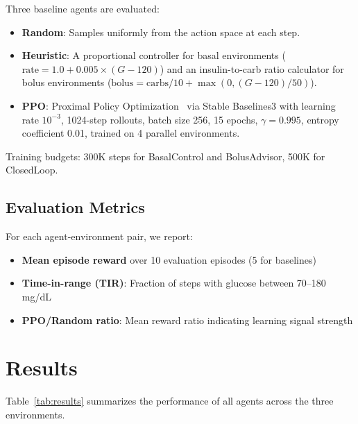 \documentclass[11pt]{article}
\begin{document}
Three baseline agents are evaluated:
\begin{itemize}
    \item \textbf{Random}: Samples uniformly from the action space at each step.
    \item \textbf{Heuristic}: A proportional controller for basal environments ($\text{rate} = 1.0 + 0.005 \times (G - 120)$) and an insulin-to-carb ratio calculator for bolus environments ($\text{bolus} = \text{carbs} / 10 + \max(0, (G - 120) / 50)$).
    \item \textbf{PPO}: Proximal Policy Optimization~\citep{schulman2017proximal} via Stable Baselines3 with learning rate $10^{-3}$, 1024-step rollouts, batch size 256, 15 epochs, $\gamma = 0.995$, entropy coefficient 0.01, trained on 4 parallel environments.
\end{itemize}

Training budgets: 300K steps for BasalControl and BolusAdvisor, 500K for ClosedLoop.

\subsection{Evaluation Metrics}

For each agent-environment pair, we report:
\begin{itemize}
    \item \textbf{Mean episode reward} over 10 evaluation episodes (5 for baselines)
    \item \textbf{Time-in-range (TIR)}: Fraction of steps with glucose between 70--180 mg/dL
    \item \textbf{PPO/Random ratio}: Mean reward ratio indicating learning signal strength
\end{itemize}

\section{Results}
\label{sec:results}

Table~\ref{tab:results} summarizes the performance of all agents across the three environments.
\end{document}

